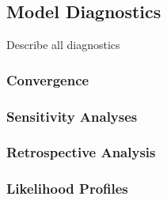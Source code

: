 \documentclass[11pt,
  english,
  a4paper,
]{article}
\begin{document}
\leavevmode\tagmcend\tagstructend


\hypertarget{model-diagnostics}{%
\subsection{Model Diagnostics}\label{model-diagnostics}}

\leavevmode\tagmcend\tagstructend


Describe all diagnostics

\leavevmode\tagmcend\tagstructend\par


\hypertarget{convergence}{%
\subsubsection{Convergence}\label{convergence}}

\leavevmode\tagmcend\tagstructend


\hypertarget{sensitivity-analyses}{%
\subsubsection{Sensitivity Analyses}\label{sensitivity-analyses}}

\leavevmode\tagmcend\tagstructend


\hypertarget{retrospective-analysis-1}{%
\subsubsection{Retrospective Analysis}\label{retrospective-analysis-1}}

\leavevmode\tagmcend\tagstructend


\hypertarget{likelihood-profiles-1}{%
\subsubsection{Likelihood Profiles}\label{likelihood-profiles-1}}

\leavevmode\tagmcend\tagstructend
\end{document}
